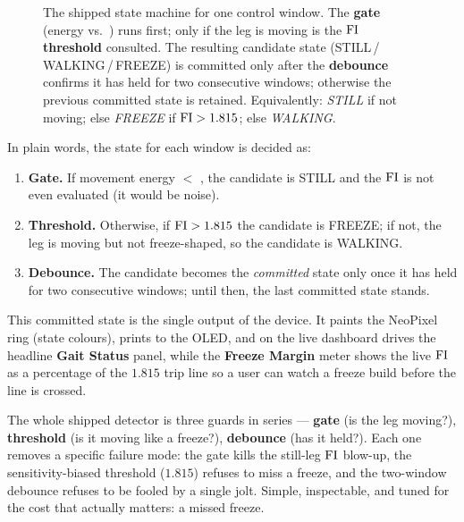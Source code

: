 \begin{figure}[H]
{}
\caption{The shipped state machine for one control window. The \textbf{gate}
(energy vs.\ ) runs first; only if the leg is moving is the
\textbf{$\mathrm{FI}$ threshold} consulted. The resulting candidate state
(STILL\,/\,WALKING\,/\,FREEZE) is committed only after the \textbf{debounce}
confirms it has held for two consecutive windows; otherwise the previous committed
state is retained. Equivalently: \emph{STILL} if not moving; else \emph{FREEZE} if
$\mathrm{FI}>1.815$; else \emph{WALKING}.}
\label{fig:tree}
\end{figure}

In plain words, the state for each window is decided as:
\begin{enumerate}
\item \textbf{Gate.} If movement energy $<$ , the candidate is
\textsf{STILL} and the $\mathrm{FI}$ is not even evaluated (it would be noise).
\item \textbf{Threshold.} Otherwise, if $\mathrm{FI} > 1.815$ the candidate is
\textsf{FREEZE}; if not, the leg is moving but not freeze-shaped, so the candidate
is \textsf{WALKING}.
\item \textbf{Debounce.} The candidate becomes the \emph{committed} state only once
it has held for two consecutive windows; until then, the last committed state
stands.
\end{enumerate}

This committed state is the single output of the device. It paints the NeoPixel
ring (state colours), prints to the OLED, and on the live dashboard drives the
headline \textbf{Gait Status} panel, while the \textbf{Freeze Margin} meter shows
the live $\mathrm{FI}$ as a percentage of the $1.815$ trip line so a user can watch a
freeze build before the line is crossed.

\begin{takeaway}
The whole shipped detector is three guards in series --- \textbf{gate} (is the leg
moving?), \textbf{threshold} (is it moving like a freeze?), \textbf{debounce} (has
it held?). Each one removes a specific failure mode: the gate kills the still-leg
$\mathrm{FI}$ blow-up, the sensitivity-biased threshold ($1.815$) refuses to miss a freeze,
and the two-window debounce refuses to be fooled by a single jolt. Simple,
inspectable, and tuned for the cost that actually matters: a missed freeze.
\end{takeaway}
